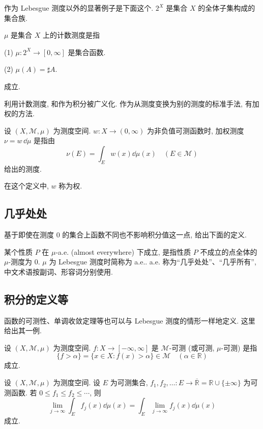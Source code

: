 作为 Lebesgue 测度以外的显著例子是下面这个. $2^{X}$ 是集合 $X$ 的全体子集构成的集合族.

\begin{definition}\label{def:2.13}
$\mu$ 是集合 $X$ 上的计数测度是指

(1) $\mu: 2^{X} \to [0, \infty]$ 是集合函数.

(2) $\mu(A) = \sharp A$.

成立.
\end{definition}

利用计数测度, 和作为积分被广义化. 作为从测度变换为别的测度的标准手法, 有加权的方法.

\begin{definition}\label{def:2.14}
设 $(X, \mathcal{M}, \mu)$ 为测度空间. $w: X \to (0, \infty)$ 为非负值可测函数时, 加权测度 $\nu = w\,\dd\mu$ 是指由
\[
\nu(E) = \int_{E}w(x)\dd\mu(x) \quad (E \in \mathcal{M})
\]
给出的测度.
\end{definition}

在这个定义中, $w$ 称为权.

\subsection*{几乎处处}

基于即使在测度 $0$ 的集合上函数不同也不影响积分值这一点, 给出下面的定义.

\begin{definition}\label{def:2.15}
某个性质 $P$ 在 $\mu$-a.e. (almost everywhere) 下成立, 是指性质 $P$ 不成立的点全体的 $\mu$-测度为 $0$. $\mu$ 为 Lebesgue 测度时简称为 a.e.. a.e. 称为``几乎处处''、``几乎所有'', 中文术语按副词、形容词分别使用.
\end{definition}

\subsection*{积分的定义等}

函数的可测性、单调收敛定理等也可以与 Lebesgue 测度的情形一样地定义. 这里给出其一例.

\begin{definition}\label{def:2.16}
设 $(X, \mathcal{M}, \mu)$ 为测度空间. $f: X \to [-\infty, \infty]$ 是 $\mathcal{M}$-可测 (或可测, $\mu$-可测) 是指
\[
\{f > \alpha\} = \{x \in X : f(x) > \alpha\} \in \mathcal{M} \quad (\alpha \in \mathbb{R})
\]
成立.
\end{definition}

\begin{theorem}[单调收敛定理]\label{thm:2.10}
设 $(X, \mathcal{M}, \mu)$ 为测度空间. 设 $E$ 为可测集合, $f_{1}, f_{2}, \ldots: E \to \overline{\mathbb{R}} = \mathbb{R} \cup \{\pm\infty\}$ 为可测函数. 若 $0 \leq f_{1} \leq f_{2} \leq \cdots$, 则
\[
\lim_{j \to \infty}\int_{E}f_{j}(x)\dd\mu(x) = \int_{E}\lim_{j \to \infty}f_{j}(x)\dd\mu(x)
\]
成立.
\end{theorem}

